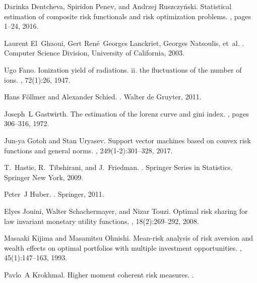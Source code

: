 \documentclass[10pt,letterpaper]{article}
\newcommand{\1}{1{\hskip -2.55 pt}\hbox{I}}
\begin{document}
\begin{thebibliography}{10}
Darinka Dentcheva, Spiridon Penev, and Andrzej Ruszczy{\'n}ski.
\newblock Statistical estimation of composite risk functionals and risk
  optimization problems.
, pages
  1--24, 2016.

Laurent El~Ghaoui, Gert Ren{\'e}~Georges Lanckriet, Georges Natsoulis, et~al.
.
\newblock Computer Science Division, University of California, 2003.

Ugo Fano.
\newblock Ionization yield of radiations. ii. the fluctuations of the number of
  ions.
, 72(1):26, 1947.

Hans F{\"o}llmer and Alexander Schied.
.
\newblock Walter de Gruyter, 2011.

Joseph~L Gastwirth.
\newblock The estimation of the lorenz curve and gini index.
, pages 306--316, 1972.

Jun-ya Gotoh and Stan Uryasev.
\newblock Support vector machines based on convex risk functions and general
  norms.
, 249(1-2):301--328, 2017.

T.~Hastie, R.~Tibshirani, and J.~Friedman.
.
\newblock Springer Series in Statistics. Springer New York, 2009.

Peter~J Huber.
.
\newblock Springer, 2011.

Elyes Jouini, Walter Schachermayer, and Nizar Touzi.
\newblock Optimal risk sharing for law invariant monetary utility functions.
, 18(2):269--292, 2008.

Masaaki Kijima and Masamitsu Ohnishi.
\newblock Mean-risk analysis of risk aversion and wealth effects on optimal
  portfolios with multiple investment opportunities.
, 45(1):147--163, 1993.

Pavlo~A Krokhmal.
\newblock Higher moment coherent risk measures.
.


\end{thebibliography}
\end{document}
